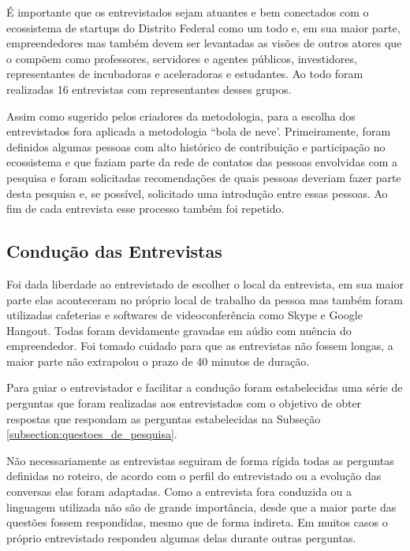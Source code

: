 É importante que os entrevistados sejam atuantes e bem conectados com o ecossistema de startups do Distrito Federal como um todo e, em sua maior parte, empreendedores mas também devem ser levantadas as visões de outros atores que o compõem como professores, servidores e agentes públicos, investidores, representantes de incubadoras e aceleradoras e estudantes. Ao todo foram realizadas 16 entrevistas com representantes desses grupos.

Assim como sugerido pelos criadores da metodologia, para a escolha dos entrevistados fora aplicada a metodologia ``bola de neve'. Primeiramente, foram definidos algumas pessoas com alto histórico de contribuição e participação no ecossistema e que faziam parte da rede de contatos das pessoas envolvidas com a pesquisa e foram solicitadas recomendações de quais pessoas deveriam fazer parte desta pesquisa e, se possível, solicitado uma introdução entre essas pessoas. Ao fim de cada entrevista esse processo também foi repetido.

\subsection{Condução das Entrevistas}
\label{subsection:conducao_das_entrevistas}

Foi dada liberdade ao entrevistado de escolher o local da entrevista, em sua maior parte elas aconteceram no próprio local de trabalho da pessoa mas também foram utilizadas cafeterias e softwares de videoconferência como Skype e Google Hangout. Todas foram devidamente gravadas em aúdio com nuência do empreendedor. Foi tomado cuidado para que as entrevistas não fossem longas, a maior parte não extrapolou o prazo de 40 minutos de duração. 

Para guiar o entrevistador e facilitar a condução foram estabelecidas uma série de perguntas que foram realizadas aos entrevistados com o objetivo de obter respostas que respondam as perguntas estabelecidas na Subseção \ref{subsection:questoes_de_pesquisa}.

Não necessariamente as entrevistas seguiram de forma rígida todas as perguntas definidas no roteiro, de acordo com o perfil do entrevistado ou a evolução das conversas elas foram adaptadas. Como a entrevista fora conduzida ou a linguagem utilizada não são de grande importância, desde que a maior parte das questões fossem respondidas, mesmo que de forma indireta. Em muitos casos o próprio entrevistado respondeu algumas delas durante outras perguntas. 

